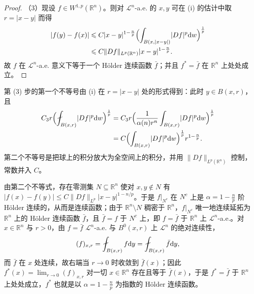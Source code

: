 \documentclass[../../main.tex]{subfiles}%
\begin{document}
\begin{proof}
（3）现设 $f\in W^{1,p}(\mathbb{R}^n)$。则对 $\mathcal{L}^{n}$-a.e. 的 $x,y$ 可在 (i) 的估计中取 $r=\lvert x-y\rvert$ 而得
\begin{align*}
\lvert f(y)-f(x)\rvert
&\leqslant C\lvert x-y\rvert^{1-\frac{n}{p}}\Bigl(\int_{B(x,\lvert x-y\rvert)}\lvert Df\rvert^{p}\mathrm{d} w\Bigr)^{\frac{1}{p}}\\
&\leqslant C\lVert Df\rVert_{L^{p}(\mathbb{R}^n)}\lvert x-y\rvert^{1-\frac{n}{p}}.
\end{align*}
故 $f$ 在 $\mathcal{L}^{n}$-a.e. 意义下等于一个 Hölder 连续函数 $\bar f$；并且 $f^*=\bar f$ 在 $\mathbb{R}^n$ 上处处成立。
\end{proof}

第 (3) 步的第一个不等号由 (i) 在 $r=\lvert x-y\rvert$ 处的形式得到：此时 $y\in B(x,r)$，且
\begin{align*}
C_3r\Bigl(\fint_{B(x,r)}\lvert Df\rvert^{p}\diff w\Bigr)^{\frac{1}{p}}
&=C_3r\Bigl(\frac{1}{\alpha(n)r^{n}}\int_{B(x,r)}\lvert Df\rvert^{p}\diff w\Bigr)^{\frac{1}{p}}\\
&=C\Bigl(\int_{B(x,r)}\lvert Df\rvert^{p}\diff w\Bigr)^{\frac{1}{p}}r^{1-\frac{n}{p}} .
\end{align*}
第二个不等号是把球上的积分放大为全空间上的积分，并用 $\lVert Df\rVert_{L^{p}(\mathbb{R}^n)}$ 控制，常数并入 $C$。

由第二个不等式，存在零测集 $N\subseteq\mathbb{R}^n$ 使对 $x,y\notin N$ 有 $\lvert f(x)-f(y)\rvert\leqslant C\lVert Df\rVert_{L^{p}}\lvert x-y\rvert^{1-n/p}$。于是 $f|_{N^{c}}$ 在 $N^{c}$ 上是 $\alpha=1-\frac{n}{p}$ 阶 Hölder 连续的，从而是连续函数；由于 $\mathbb{R}^n\setminus N$ 稠密于 $\mathbb{R}^n$，$f|_{N^{c}}$ 唯一地连续延拓为 $\mathbb{R}^n$ 上的 Hölder 连续函数 $\bar f$，且 $\bar f=f$ 于 $N^{c}$ 上，即 $f=\bar f$ 于 $\mathbb{R}^n$ 上 $\mathcal{L}^{n}$-a.e.。对 $x\in\mathbb{R}^n$ 与 $r>0$，由 $f=\bar f$ $\mathcal{L}^{n}$-a.e. 与 $B^{0}(x,r)$ 上 $\mathcal{L}^{n}$ 的绝对连续性，
\begin{align*}
(f)_{x,r}=\fint_{B(x,r)}f\diff y=\fint_{B(x,r)}\bar f\diff y,
\end{align*}
而 $\bar f$ 在 $x$ 处连续，故右端当 $r\to0$ 时收敛到 $\bar f(x)$；因此 $f^*(x)=\lim_{r\to0}(f)_{x,r}$ 对一切 $x\in\mathbb{R}^n$ 存在且等于 $\bar f(x)$，于是 $f^*=\bar f$ 于 $\mathbb{R}^n$ 上处处成立，$f^*$ 也就是以 $\alpha=1-\frac{n}{p}$ 为指数的 Hölder 连续函数。
\end{document}
